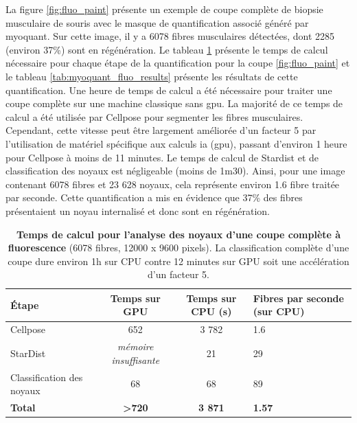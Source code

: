 La figure \ref{fig:fluo_paint} présente un exemple de coupe complète de biopsie musculaire de souris avec le masque de quantification associé généré par \gls{myoquant}. Sur cette image, il y a 6078 fibres musculaires détectées, dont 2285 (environ 37\%) sont en régénération. Le tableau \ref{tab:myoquant_fluo_time} présente le temps de calcul nécessaire pour chaque étape de la quantification pour la coupe \ref{fig:fluo_paint} et le tableau \ref{tab:myoquant_fluo_results} présente les résultats de cette quantification. Une heure de temps de calcul a été nécessaire pour traiter une coupe complète sur une machine classique sans \gls{gpu}. La majorité de ce temps de calcul a été utilisée par Cellpose pour segmenter les fibres musculaires. Cependant, cette vitesse peut être largement améliorée d'un facteur 5 par l'utilisation de matériel spécifique aux calculs \gls{ia} (\gls{gpu}), passant d’environ 1 heure pour Cellpose à moins de 11 minutes. Le temps de calcul de Stardist et de classification des noyaux est négligeable (moins de 1m30). Ainsi, pour une image contenant 6078 fibres et 23 628 noyaux, cela représente environ 1.6 fibre traitée par seconde. Cette quantification a mis en évidence que 37\% des fibres présentaient un noyau internalisé et donc sont en régénération.
\begin{table}[!htbp]
\centering
\caption[Temps de calcul pour l'analyse des noyaux d'une coupe complète à fluorescence]{\textbf{Temps de calcul pour l'analyse des noyaux d'une coupe complète à fluorescence} (6078 fibres, 12000 x 9600 pixels). La classification complète d'une coupe dure environ 1h sur CPU contre 12 minutes sur GPU soit une accélération d'un facteur 5.}
\label{tab:myoquant_fluo_time}
\begin{tabularx}{\textwidth}{|l|c|c|X|}
\hline
\textbf{Étape} & \textbf{Temps sur GPU} & \textbf{Temps sur CPU (s)} & \textbf{Fibres par seconde (sur CPU)} \\
\hline
Cellpose & 652 & 3 782 & 1.6 \\
\hline
StarDist & \textit{mémoire insuffisante} & 21 & 29 \\
\hline
Classification des noyaux & 68 & 68 & 89 \\
\hline
\textbf{Total} & \textbf{>720} & \textbf{3 871} & \textbf{1.57} \\
\hline
\end{tabularx}
\end{table}

